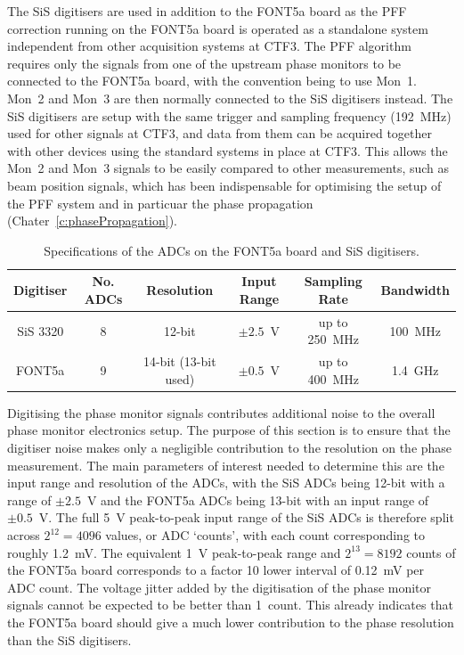 The SiS digitisers are used in addition to the FONT5a board as the PFF correction running on the FONT5a board is operated as a standalone system independent from other acquisition systems at CTF3. The PFF algorithm requires only the signals from one of the upstream phase monitors to be connected to the FONT5a board, with the convention being to use Mon~1. Mon~2 and Mon~3 are then normally connected to the SiS digitisers instead. The SiS digitisers are setup with the same trigger and sampling frequency (192~MHz) used for other signals at CTF3, and data from them can be acquired together with other devices using the standard systems in place at CTF3. This allows the Mon~2 and Mon~3 signals to be easily compared to other measurements, such as beam position signals, which has been indispensable for optimising the setup of the PFF system and in particuar the phase propagation (Chater~\ref{c:phasePropagation}).

\begin{table}
  \begin{center}
    \begin{tabular}{|c c c c c c|}
	   \hline
       Digitiser & No. ADCs & Resolution & Input Range & Sampling Rate & Bandwidth \\ \hline
       SiS 3320 & 8 & 12-bit & \(\pm2.5\)~V & up to 250~MHz & 100~MHz\\
       FONT5a & 9 & 14-bit (13-bit used) & \(\pm0.5\)~V & up to 400~MHz & 1.4~GHz\\ \hline
    \end{tabular}
    \caption{Specifications of the ADCs on the FONT5a board and SiS digitisers.}
  	\label{t:adcSpecs}
  \end{center}
\end{table}

Digitising the phase monitor signals contributes additional noise to the overall phase monitor electronics setup. The purpose of this section is to ensure that the digitiser noise makes only a negligible contribution to the resolution on the phase measurement. The main parameters of interest needed to determine this are the input range and resolution of the ADCs, with the SiS ADCs being 12-bit with a range of \(\pm2.5\)~V and the FONT5a ADCs being 13-bit with an input range of \(\pm0.5\)~V. The full 5~V peak-to-peak input range of the SiS ADCs is therefore split across \(2^{12}=4096\) values, or ADC `counts', with each count corresponding to roughly 1.2~mV. The equivalent 1~V peak-to-peak range and \(2^{13}=8192\) counts of the FONT5a board corresponds to a factor 10 lower interval of 0.12~mV per ADC count. The voltage jitter added by the digitisation of the phase monitor signals cannot be expected to be better than 1~count. This already indicates that the FONT5a board should give a much lower contribution to the phase resolution than the SiS digitisers.

